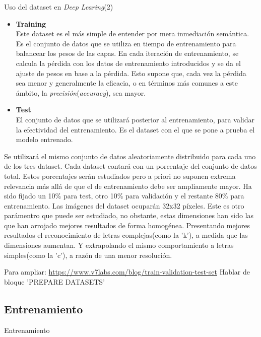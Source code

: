 \begin{teoria}{Uso del dataset en \textit{Deep Learing}(2)\textsuperscript{\cite{Andreas}}}
    \color{mitexto}
    \begin{itemize}
        \itemsep0em 
        \item \textbf{Training}\\
        {\small Este dataset es el más simple de entender por mera inmediación
        semántica. Es el conjunto de datos que se utiliza en tiempo de entrenamiento
        para balancear los pesos de las capas. En cada iteración de entrenamiento,
        se calcula la pérdida con los datos de entrenamiento introducidos y
        se da el ajuste de pesos en base a la pérdida. Esto supone que, cada vez la
        pérdida sea menor y generalmente la eficacia, o en términos más comunes a este
        ámbito, la \textit{precisión}(\textit{accuracy}), sea mayor.}
        \item \textbf{Test}\\
        {\small El conjunto de datos que se utilizará posterior al entrenamiento, para
        validar la efectividad del entrenamiento.\newline
        Es el dataset con el que se pone a prueba el modelo entrenado.}
    \end{itemize}
\end{teoria}
Se utilizará el mismo conjunto de datos aleatoriamente distribuido para cada
uno de los tres dataset. Cada dataset contará con un porcentaje del conjunto de datos
total. Estos porcentajes serán estudiados pero a priori no suponen extrema relevancia
más allá de que el de entrenamiento debe ser ampliamente mayor. Ha sido fijado un
10\% para test, otro 10\% para validación y el restante 80\% para entrenamiento.\newline
Las imágenes del dataset ocuparán 32x32 píxeles. Este es otro parámentro que puede
ser estudiado, no obstante, estas dimensiones han sido las que han arrojado mejores
resultados de forma homogénea. \newline Presentando mejores resultados el reconocimiento
de letras complejas(como la 'k'), a medida que las dimensiones aumentan. Y extrapolando
el mismo comportamiento a letras simples(como la 'c'), a razón de una menor resolución.

{\color{red}Para ampliar: \url{https://www.v7labs.com/blog/train-validation-test-set}}
{\color{red}Hablar de bloque 'PREPARE DATASETS'}

\subsection{Entrenamiento}
{\color{red} Entrenamiento}\\

